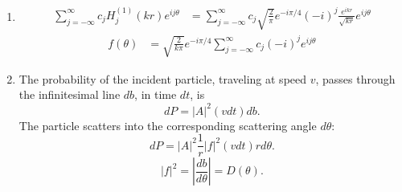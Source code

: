 \begin{enumerate}
\begin{align*}
          \end{align*}
          Let $s=k=\frac{\sqrt{2m}}{\hbar}$, then $G(y) = AH_j^{(1)}(y)+BH_j^{(2)}(y)$. Note that the $H_j^{(1)}$ acts like an outgoing wave, whereas $H_j^{(2)}$ acts like an incoming wave, thus
          $$
              R(r) \sim H_j^{(1)} (kr),
          $$
          and
          \begin{align*}
              \psi(r,\theta) =
              A\left\{
              e^{ikx} + \sum_{j=-\infty}^{\infty}
              c_j     H_j^{(1)} (kr)e^{ij\theta}
              \right \}.
          \end{align*}
    \item
          \begin{align*}
              \sum_{j=-\infty}^{\infty}c_j  H_j^{(1)} (kr)e^{ij\theta} & =
              \sum_{j=-\infty}^{\infty}c_j
              \sqrt{\frac{2}{\pi}}
              e^{-i\pi/4}(-i)^j
              \frac{e^{ikr}}{\sqrt{kr}}
              e^{ij\theta}
          \end{align*}
          \begin{align*}
              f(\theta) & =
              \sqrt{\frac{2}{k\pi}}
              e^{-i\pi/4}
              \sum_{j=-\infty}^{\infty}c_j
              (-i)^j
              e^{ij\theta}
          \end{align*}
    \item
          The probability of the incident particle, traveling at speed $v$, passes through the infinitesimal line $db$, in time $dt$, is
          $$
              dP = |A|^2 (vdt)db.
          $$
          The particle scatters into the corresponding scattering angle $d\theta$:
          $$
              dP = |A|^2\frac{1}{r}|f|^2(vdt)rd\theta.
          $$
          $$
              |f|^2 = \left|\frac{db}{d\theta}\right| = D(\theta).
          $$


\end{enumerate}
